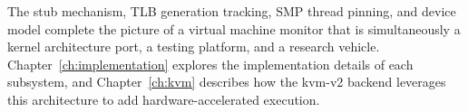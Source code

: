 The stub mechanism, TLB generation tracking, SMP thread pinning, and device
model complete the picture of a virtual machine monitor that is simultaneously
a kernel architecture port, a testing platform, and a research vehicle.
Chapter~\ref{ch:implementation} explores the implementation details of each
subsystem, and Chapter~\ref{ch:kvm} describes how the kvm-v2 backend
leverages this architecture to add hardware-accelerated execution.
